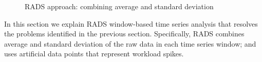 \begin{figure}[!h]
  \centering
   {}
   \caption{RADS approach: combining average and standard deviation}
  \label{fig:avg_sd_combined}
\end{figure}

\noindent In this section we explain RADS window-based time series analysis that resolves the problems identified in the previous section. 
Specifically, RADS combines average and standard deviation of the raw data in each time series window; and uses artificial data points that represent workload spikes. 

